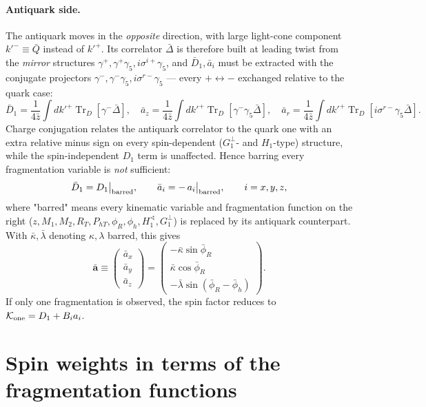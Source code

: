 \documentclass[10pt]{article}
\newcommand{\Tr}{\operatorname{Tr}}
\begin{document}
\paragraph{Antiquark side.} The antiquark moves in the \emph{opposite}
direction, with large light-cone component \(k'^-\equiv\bar Q\) instead
of \(k'^+\).  Its correlator \(\bar\Delta\) is therefore built at leading
twist from the \emph{mirror} structures \(\gamma^+,\gamma^+\gamma_5,
i\sigma^{i+}\gamma_5\), and \(\bar D_1,\bar a_i\) must be extracted with
the conjugate projectors \(\gamma^-,\gamma^-\gamma_5,i\sigma^{r-}\gamma_5\)
— every \(+\leftrightarrow-\) exchanged relative to the quark case:
\[
\bar D_1=\frac1{4\bar z}\int dk'^+\Tr_D[\gamma^-\bar\Delta],
\quad
\bar a_z=\frac1{4\bar z}\int dk'^+\Tr_D[\gamma^-\gamma_5\bar\Delta],
\quad
\bar a_r=\frac1{4\bar z}\int dk'^+\Tr_D[i\sigma^{r-}\gamma_5\bar\Delta].
\]
Charge conjugation relates the antiquark correlator to the quark one with
an extra relative minus sign on every spin-dependent (\(G_1^\perp\)- and
\(H_1\)-type) structure, while the spin-independent \(D_1\) term is
unaffected.  Hence barring every fragmentation variable is \emph{not}
sufficient:
\[
\bar D_1=D_1\big|_{\rm barred},
\qquad
\bar a_i=-\,a_i\big|_{\rm barred} ,
\qquad i=x,y,z ,
\]
where "barred" means every kinematic variable and fragmentation function
on the right (\(z,M_1,M_2,R_T,P_{hT},\phi_R,\phi_h,H_1^{\sphericalangle},
G_1^\perp\)) is replaced by its antiquark counterpart.  With
\(\bar\kappa,\bar\lambda\) denoting \(\kappa,\lambda\) barred, this gives
\[
\bar{\mathbf a}\equiv\begin{pmatrix}\bar a_x\\\bar a_y\\\bar a_z\end{pmatrix}
=\begin{pmatrix}-\bar\kappa\sin\bar\phi_R\\\bar\kappa\cos\bar\phi_R\\
-\bar\lambda\sin(\bar\phi_R-\bar\phi_h)\end{pmatrix} .
\]
If only one fragmentation is observed, the spin factor reduces to
\({\cal K}_{\rm one}=D_1+B_i a_i\).

\section{Spin weights in terms of the fragmentation functions}
\end{document}

